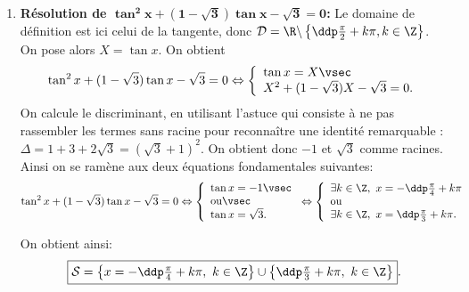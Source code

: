 
\begin{correction}  \;
\begin{enumerate}
\item  \textbf{R\'esolution de $\mathbf{ \tan^2{x}+(1-\sqrt{3})\tan{x}-\sqrt{3}=0 }$:}
Le domaine de d\'efinition est ici celui de la tangente, donc $\mathcal{D} = \R \backslash \left\{\ddp \frac{\pi}{2}+k\pi, k \in \Z\right\}$.
On pose alors $X=\tan{x}$.
On obtient
$$
\tan^2{x}+(1-\sqrt{3})\tan{x}-\sqrt{3}=0\Leftrightarrow 
\left\lbrace\begin{array}{l}
\tan{x}=X\vsec\\
X^2+(1-\sqrt{3})X-\sqrt{3}=0.
\end{array}\right.$$
On calcule le discriminant, en utilisant l'astuce qui consiste \`a ne pas rassembler les termes sans racine pour reconna\^itre une identit\'e remarquable : $\Delta=1+3+2\sqrt{3}=(\sqrt{3}+1)^2.$ On obtient donc $-1$ et $\sqrt{3}$ comme racines. Ainsi on se ram\`ene aux deux \'equations fondamentales suivantes:
$$
\tan^2{x}+(1-\sqrt{3})\tan{x}-\sqrt{3}=0\Leftrightarrow
\left\lbrace\begin{array}{l}
\tan{x}=-1\vsec\\
\hbox{ou}\vsec\\
\tan{x}=\sqrt{3}.
\end{array}\right.
\Leftrightarrow
\left\lbrace\begin{array}{l}
\exists k\in\Z,\ x=-\ddp\frac{\pi}{4}+k\pi\\
\hbox{ou}\\
\exists k\in\Z,\ x=\ddp\frac{\pi}{3}+k\pi.\\
\end{array} \right.
$$
\begin{minipage}[c]{0.45\textwidth}
On obtient ainsi: 
$$\fbox{$\mathcal{S}=\left\lbrace x=-\ddp\frac{\pi}{4}+k\pi,\ k\in\Z\right\rbrace\cup\left\lbrace \ddp\frac{\pi}{3}+k\pi,\ k\in\Z\right\rbrace$}.$$
\end{minipage}
\quad \begin{minipage}[c]{0.45\textwidth}
\begin{center}
\end{center}
\end{minipage}
\end{enumerate}
\end{correction}
